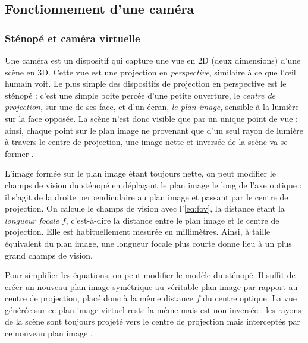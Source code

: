 \subsection{Fonctionnement d'une caméra}
\subsubsection{Sténopé et caméra virtuelle}
Une caméra est un dispositif qui capture une vue en 2D (deux dimensions) d'une scène en 3D. Cette vue est une projection en \emph{perspective}, similaire à ce que l'\oe il humain voit. Le plus simple des dispositifs de projection en perspective est le sténopé : c'est une simple boite percée d'une petite ouverture, le \emph{centre de projection}, sur une de ses face, et d'un écran, \emph{le plan image}, sensible à la lumière sur la face opposée. La scène n'est donc visible que par un unique point de vue : ainsi, chaque point sur le plan image ne provenant que d'un seul rayon de lumière à travers le centre de projection, une image nette et inversée de la scène va se former .


L'image formée sur le plan image étant toujours nette, on peut modifier le champs de vision du sténopé en déplaçant le plan image le long de l'axe optique : il s'agit de la droite perpendiculaire au plan image et passant par le centre de projection. On calcule le champs de vision avec l'\autoref{eq:fov}, la distance étant la \emph{longueur focale} $f$, c'est-à-dire la distance entre le plan image et le centre de projection. Elle est habituellement mesurée en millimètres. Ainsi, à taille équivalent du plan image, une longueur focale plus courte donne lieu à un plus grand champs de vision.

Pour simplifier les équations, on peut modifier le modèle du sténopé. Il suffit de créer un nouveau plan image symétrique au véritable plan image par rapport au centre de projection, placé donc à la même distance $f$ du centre optique. La vue générée sur ce plan image virtuel reste la même mais est non inversée : les rayons de la scène sont toujours projeté vers le centre de projection mais interceptés par ce nouveau plan image .

